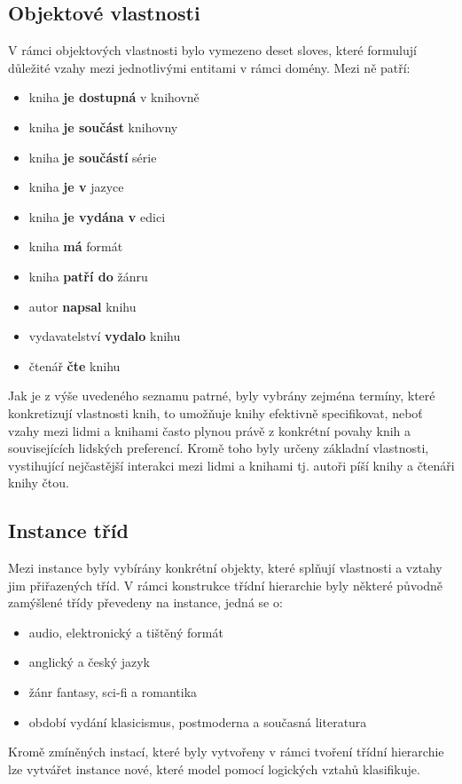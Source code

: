 \documentclass[a4paper,oneside,11pt,usenames,dvipsnames]{article}
\begin{document}
\subsection{Objektové vlastnosti}
V rámci objektových vlastnosti bylo vymezeno deset sloves, které formulují důležité vzahy mezi jednotlivými entitami v rámci domény. Mezi ně patří:
\begin{itemize}
    \item kniha \textbf{je dostupná} v knihovně
    \item kniha \textbf{je součást} knihovny
    \item kniha \textbf{je součástí} série
    \item kniha \textbf{je v} jazyce
    \item kniha \textbf{je vydána v} edici
    \item kniha \textbf{má} formát
    \item kniha \textbf{patří do} žánru
    \item autor \textbf{napsal} knihu
    \item vydavatelství \textbf{vydalo} knihu
    \item čtenář \textbf{čte} knihu
\end{itemize}
Jak je z výše uvedeného seznamu patrné, byly vybrány zejména termíny, které konkretizují vlastnosti knih, to umožňuje knihy efektivně specifikovat, neboť vzahy mezi lidmi a knihami často plynou právě z konkrétní povahy knih a souvisejících lidských preferencí.
Kromě toho byly určeny základní vlastnosti, vystihující nejčastější interakci mezi lidmi a knihami tj. autoři píší knihy a čtenáři knihy čtou.

\subsection{Instance tříd}
Mezi instance byly vybírány konkrétní objekty, které splňují vlastnosti a vztahy jim přiřazených tříd. V rámci konstrukce třídní hierarchie byly některé původně zamýšlené třídy převedeny na instance, jedná se o:
\begin{itemize}
    \item audio, elektronický a tištěný formát
    \item anglický a český jazyk
    \item žánr fantasy, sci-fi a romantika
    \item období vydání klasicismus, postmoderna a současná literatura
\end{itemize}
Kromě zmíněných instací, které byly vytvořeny v rámci tvoření třídní hierarchie lze vytvářet instance nové, které model pomocí logických vztahů klasifikuje.
\end{document}
